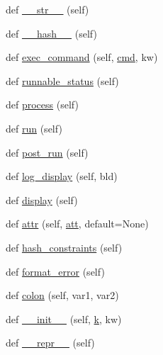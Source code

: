 \begin{DoxyCompactItemize}
\item 
def \hyperlink{classwaflib_1_1_task_1_1_task_base_a07123f80c95b1d17a699064cd10d8885}{\+\_\+\+\_\+str\+\_\+\+\_\+} (self)
\item 
def \hyperlink{classwaflib_1_1_task_1_1_task_base_a5e02f89716bcd37b2490adc0861c4bdd}{\+\_\+\+\_\+hash\+\_\+\+\_\+} (self)
\item 
def \hyperlink{classwaflib_1_1_task_1_1_task_base_a6326ff82d67a2b629c8d78b95cb8fec6}{exec\+\_\+command} (self, \hyperlink{sndfile__play_8m_adfc5ba7e22f5e4a6221c12a70503bef3}{cmd}, kw)
\item 
def \hyperlink{classwaflib_1_1_task_1_1_task_base_a10c4597d9085bd1680f9b3eb28e23899}{runnable\+\_\+status} (self)
\item 
def \hyperlink{classwaflib_1_1_task_1_1_task_base_ae5e951a187c8d09c31960bbcf76fad25}{process} (self)
\item 
def \hyperlink{classwaflib_1_1_task_1_1_task_base_ae549bc1a80fd94cc94fd1e764c76895c}{run} (self)
\item 
def \hyperlink{classwaflib_1_1_task_1_1_task_base_a21b09d3f18df76e1d8b0719f321ea3bd}{post\+\_\+run} (self)
\item 
def \hyperlink{classwaflib_1_1_task_1_1_task_base_adf380fd031fc987f4dcd54e1f70420a7}{log\+\_\+display} (self, bld)
\item 
def \hyperlink{classwaflib_1_1_task_1_1_task_base_a838316cf55ac50fab2ae0e8771917e74}{display} (self)
\item 
def \hyperlink{classwaflib_1_1_task_1_1_task_base_a8ead2ec09545f4e9e27d6b40f9f80eaa}{attr} (self, \hyperlink{filters_8h_a6cbe32dd86cefd1a8b182b3ee652e9bf}{att}, default=None)
\item 
def \hyperlink{classwaflib_1_1_task_1_1_task_base_ad4f2583a59ff62565735490154826033}{hash\+\_\+constraints} (self)
\item 
def \hyperlink{classwaflib_1_1_task_1_1_task_base_a321e667402035aa56626ee6f7b3b8223}{format\+\_\+error} (self)
\item 
def \hyperlink{classwaflib_1_1_task_1_1_task_base_ae9648ec691e059291a79f38ef6ee12cc}{colon} (self, var1, var2)
\item 
def \hyperlink{classwaflib_1_1_task_1_1_task_base_add6ae927b00bd1f14d5b87738dd53e70}{\+\_\+\+\_\+init\+\_\+\+\_\+} (self, \hyperlink{rfft2d_test_m_l_8m_adc468c70fb574ebd07287b38d0d0676d}{k}, kw)
\item 
def \hyperlink{classwaflib_1_1_task_1_1_task_base_a004a67fbb5d7e36d1a6ba48390e0d5f7}{\+\_\+\+\_\+repr\+\_\+\+\_\+} (self)
\item 

\end{DoxyCompactItemize}
